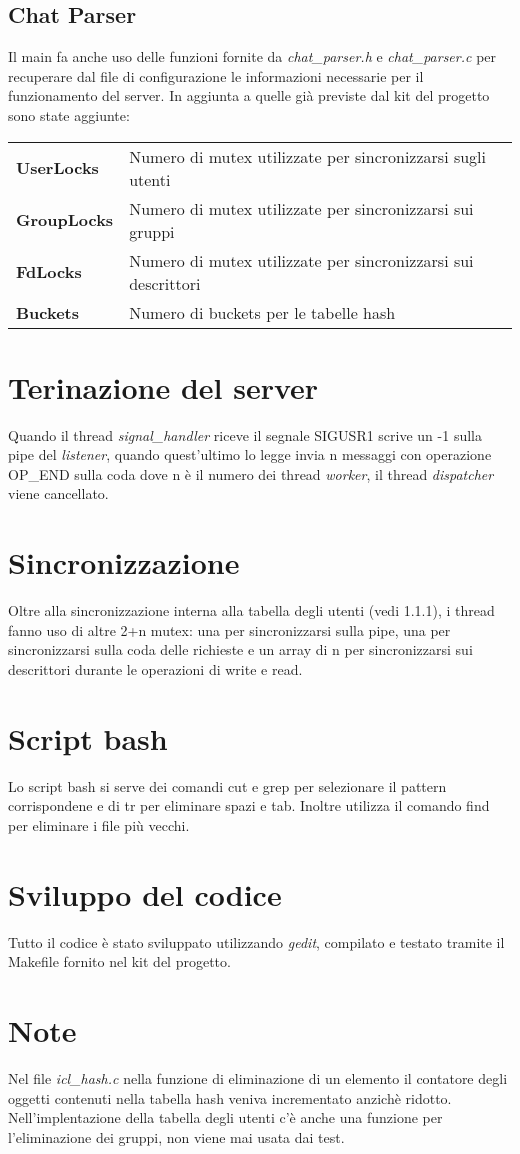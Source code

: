 \documentclass[11pt]{article}
\begin{document}
\subsection{Chat Parser}
Il main fa anche uso delle funzioni fornite da \emph{chat\_parser.h} e \emph{chat\_parser.c} per recuperare dal file di configurazione le informazioni necessarie per il funzionamento del server. In aggiunta a quelle gi\`a previste dal kit del progetto sono state aggiunte:

\begin{tabular}{ll}
	\textbf{UserLocks} & Numero di mutex utilizzate per sincronizzarsi sugli utenti\\
	\textbf{GroupLocks} & Numero di mutex utilizzate per sincronizzarsi sui gruppi\\
	\textbf{FdLocks} & Numero di mutex utilizzate per sincronizzarsi sui descrittori\\
	\textbf{Buckets} & Numero di buckets per le tabelle hash\\
\end{tabular}

\section{Terinazione del server}
Quando il thread \emph{signal\_handler} riceve il segnale SIGUSR1 scrive un -1 sulla pipe del \emph{listener}, quando quest'ultimo lo legge invia n messaggi con operazione OP\_END sulla coda dove n \`e il numero dei thread \emph{worker}, il thread \emph{dispatcher} viene cancellato.

\section{Sincronizzazione}
Oltre alla sincronizzazione interna alla tabella degli utenti (vedi 1.1.1), i thread fanno uso di altre 2+n mutex: una per sincronizzarsi sulla pipe, una per sincronizzarsi sulla coda delle richieste e un array di n per sincronizzarsi sui descrittori durante le operazioni di write e read.

\section{Script bash}
Lo script bash si serve dei comandi cut e grep per selezionare il pattern corrispondene e di tr per eliminare spazi e tab. Inoltre utilizza il comando find per eliminare i file pi\`u vecchi.
\section{Sviluppo del codice}
Tutto il codice è stato sviluppato utilizzando \emph{gedit}, compilato e testato tramite il Makefile fornito nel kit del progetto.
\section{Note}
Nel file \emph{icl\_hash.c} nella funzione di eliminazione di un elemento il contatore degli oggetti contenuti nella tabella hash veniva incrementato anzich\`e ridotto.
Nell'implentazione della tabella degli utenti c'\`e anche una funzione per l'eliminazione dei gruppi, non viene mai usata dai test.
\end{document}
